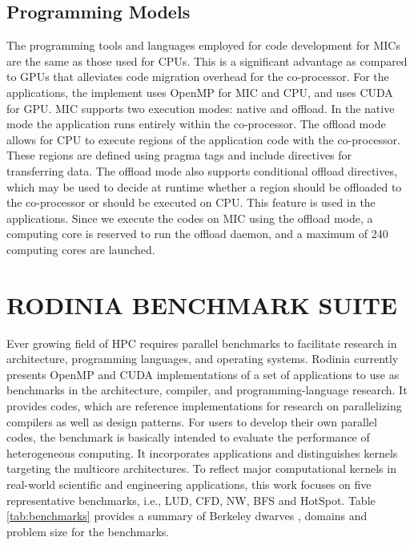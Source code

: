 \subsection{Programming Models\\}
The programming tools and languages employed for code development for MICs are the same as those used for CPUs. This is a significant advantage as compared to GPUs that alleviates code migration overhead for the co-processor. For the applications, the implement uses OpenMP for MIC and CPU, and uses CUDA for GPU. MIC supports two execution modes: native and offload. In the native mode the application runs entirely within the co-processor. The offload mode allows for CPU to execute regions of the application code with the co-processor. These regions are defined using pragma tags and include directives for transferring data. The offload mode also supports conditional offload directives, which may be used to decide at runtime whether a region should be offloaded to the co-processor or should be executed on CPU. This feature is used in the applications. Since we execute the codes on MIC using the offload mode, a computing core is reserved to run the offload daemon, and a maximum of 240 computing cores are launched.
  
  
  \section{RODINIA BENCHMARK SUITE}

  Ever growing field of HPC requires parallel benchmarks to facilitate research in architecture, programming languages, and operating systems. Rodinia currently presents OpenMP and CUDA implementations of a set of applications to use as benchmarks in the architecture, compiler, and programming-language research. It provides codes, which are reference implementations for research on parallelizing compilers as well as design patterns. For users to develop their own parallel codes, the benchmark is basically intended to evaluate the performance of heterogeneous computing. It incorporates applications and distinguishes kernels targeting the multicore architectures. To reflect major computational kernels in real-world scientific and engineering applications, this work focuses on five representative benchmarks, i.e., LUD, CFD, NW, BFS and HotSpot. Table \ref{tab:benchmarks} provides a summary of Berkeley dwarves \cite{asanovic2006landscape}, domains and problem size for the benchmarks. 



